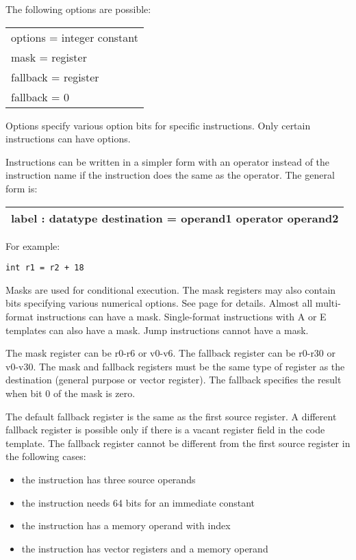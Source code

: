 \documentclass[forwardcom.tex]{subfiles}
\begin{document}
The following options are possible:\\
\begin{tabular}{|p{140mm}|}
\hline
options = integer constant\\
mask = register\\
fallback = register\\
fallback = 0\\
\hline
\end{tabular}
\vv

Options specify various option bits for specific instructions. 
Only certain instructions can have options.
\vv

Instructions can be written in a simpler form with an operator instead of the instruction name if the instruction does the same as the operator. The general form is:
\vv

\begin{tabular}{|p{140mm}|}
\hline
\hspace{4mm} label : datatype destination = operand1 operator operand2 \\
\hline
\end{tabular}
\vspace{4mm}

For example:
\begin{lstlisting}[frame=single]
int r1 = r2 + 18
\end{lstlisting}
\vv


Masks are used for conditional execution. The mask registers may also contain bits specifying various numerical options. See page \pageref{MaskAndFallback} for details. 
Almost all multi-format instructions can have a mask. Single-format instructions with A or E templates can also have a mask. Jump instructions cannot have a mask.
\vv

The mask register can be r0-r6 or v0-v6. The fallback register can be r0-r30 or v0-v30. 
The mask and fallback registers must be the same type of register as the destination (general purpose or vector register). The fallback specifies the result when bit 0 of the mask is zero.
\vv

The default fallback register is the same as the first source register. A different fallback register is  possible only if there is a vacant register field in the code template. 
The fallback register cannot be different from the first source register in the following cases:
\begin{itemize}
\item the instruction has three source operands
\item the instruction needs 64 bits for an immediate constant
\item the instruction has a memory operand with index
\item the instruction has vector registers and a memory operand
\end{itemize}
\vv
\end{document}
